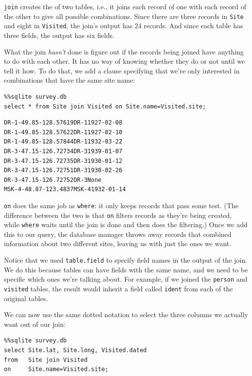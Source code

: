 \documentclass{book}
\begin{document}
\texttt{join} creates the  of
two tables, i.e., it joins each record of one with each record of the
other to give all possible combinations. Since there are three records
in \texttt{Site} and eight in \texttt{Visited}, the join's output has 24
records. And since each table has three fields, the output has six
fields.

What the join \emph{hasn't} done is figure out if the records being
joined have anything to do with each other. It has no way of knowing
whether they do or not until we tell it how. To do that, we add a clause
specifying that we're only interested in combinations that have the same
site name:

\begin{verbatim}
%%sqlite survey.db
select * from Site join Visited on Site.name=Visited.site;
\end{verbatim}

\begin{verbatim}
DR-1-49.85-128.57619DR-11927-02-08
DR-1-49.85-128.57622DR-11927-02-10
DR-1-49.85-128.57844DR-11932-03-22
DR-3-47.15-126.72734DR-31939-01-07
DR-3-47.15-126.72735DR-31930-01-12
DR-3-47.15-126.72751DR-31930-02-26
DR-3-47.15-126.72752DR-3None
MSK-4-48.87-123.4837MSK-41932-01-14
\end{verbatim}

\texttt{on} does the same job as \texttt{where}: it only keeps records
that pass some test. (The difference between the two is that \texttt{on}
filters records as they're being created, while \texttt{where} waits
until the join is done and then does the filtering.) Once we add this to
our query, the database manager throws away records that combined
information about two different sites, leaving us with just the ones we
want.

Notice that we used \texttt{table.field} to specify field names in the
output of the join. We do this because tables can have fields with the
same name, and we need to be specific which ones we're talking about.
For example, if we joined the \texttt{person} and \texttt{visited}
tables, the result would inherit a field called \texttt{ident} from each
of the original tables.

We can now use the same dotted notation to select the three columns we
actually want out of our join:

\begin{verbatim}
%%sqlite survey.db
select Site.lat, Site.long, Visited.dated
from   Site join Visited
on     Site.name=Visited.site;
\end{verbatim}
\end{document}
